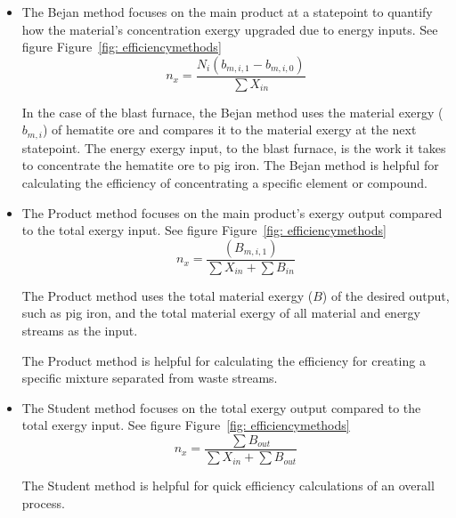 \documentclass[energies,article,submit,pdftex,moreauthors]{Definitions/mdpi}
\begin{document}
\begin{itemize}
  \item The Bejan method focuses on the main product
  at a statepoint
  to quantify how the material's concentration exergy upgraded
  due to energy inputs.
  See figure Figure~\ref{fig: efficiencymethods}\\

  \begin{equation}\label{eq:Bejan Efficiency}
  n_{x} = \frac{N_i(b_{m,i,1} - b_{m,i,0})}{\sum{X_{in}}}
  \end{equation}

  In the case of the blast furnace,
  the Bejan method uses the material exergy ($b_{m,i}$)
  of hematite ore
  and compares it to the material exergy
  at the next statepoint.
  The energy exergy input, to the blast furnace,
  is the work it takes to concentrate the hematite ore
  to pig iron.
  The Bejan method is helpful
  for calculating the efficiency
  of concentrating a specific element or compound.

  \item The Product method focuses on the main product's exergy output
  compared to the total exergy input.
  See figure Figure~\ref{fig: efficiencymethods}\\

  \begin{equation}\label{eq:Product Efficiency}
  n_{x} = \frac{(B_{m,i,1})}{\sum{X_{in}}+\sum{B_{in}}}
  \end{equation}

  The Product method uses the total material exergy ($B$) of the desired output,
  such as pig iron,
  and the total material exergy
  of all material and energy streams
  as the input.

  The Product method is helpful
  for calculating the efficiency
  for creating a specific mixture separated
  from waste streams.\\

  \item The Student method focuses on the total exergy output
  compared to the total exergy input.
  See figure Figure~\ref{fig: efficiencymethods}\\

  \begin{equation}\label{eq:Product Efficiency}
  n_{x} = \frac{\sum{B_{out}}}{\sum{X_{in}} + \sum{B_{out}}}
  \end{equation}

  The Student method is helpful
  for quick efficiency calculations
  of an overall process.

\end{itemize}
\end{document}
